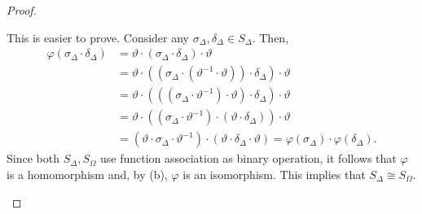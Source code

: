 \documentclass[12pt]{article}
\newenvironment{problem}[2][Problem]{\begin{trivlist} \item[\hskip \labelsep {\bfseries #1}\hskip \labelsep {\bfseries #2.}]}{\end{trivlist}}
\begin{document}
\begin{problem}{10}
\begin{proof}
\begin{enumerate}
    This is easier to prove. Consider any $\sigma_{\Delta},\delta_{\Delta}\in S_{\Delta}$. Then, 
\begin{align*}
  \varphi \left( \sigma_{\Delta}\cdot \delta_{\Delta} \right) &= \vartheta \cdot \left( \sigma_{\Delta}\cdot \delta_{\Delta} \right)\cdot \vartheta\\ 
  &= \vartheta \cdot \left( (\sigma_{\Delta}\cdot (\vartheta^{-1}\cdot \vartheta))\cdot \delta_{\Delta} \right)\cdot \vartheta\\ 
&= \vartheta \cdot \left( ((\sigma_{\Delta}\cdot \vartheta^{-1})\cdot \vartheta)\cdot \delta_{\Delta} \right)\cdot \vartheta\\ 
&= \vartheta \cdot \left( (\sigma_{\Delta}\cdot \vartheta^{-1})\cdot (\vartheta \cdot \delta_{\Delta}) \right)\cdot \vartheta\\ 
&= (\vartheta \cdot \sigma_{\Delta}\cdot \vartheta^{-1})\cdot (\vartheta \cdot \delta_{\Delta}\cdot \vartheta) = \varphi(\sigma_{\Delta}) \cdot \varphi(\delta_{\Delta}). 
\end{align*}
Since both $S_{\Delta},S_{\Omega}$ use function association as binary operation, it follows that $\varphi$ is a homomorphism and, by (b), $\varphi$ is an isomorphism. This implies that $S_{\Delta} \cong S_{\Omega}$.
\end{enumerate}
\end{proof}
\end{problem}
       
\end{document}
